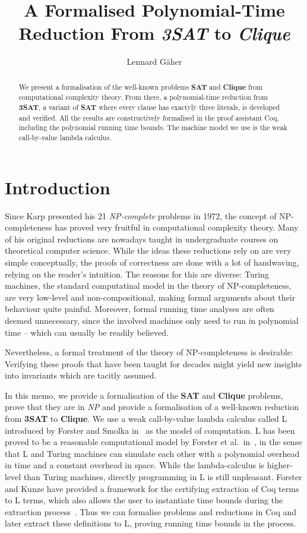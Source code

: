 \documentclass[a4paper,UKenglish,cleveref, autoref]{lipics-v2019}
\title{A Formalised Polynomial-Time Reduction From \emph{3SAT} to \emph{Clique}} %
\author{Lennard Gäher}{Saarland University, Germany}{s8legaeh@stud.uni-saarland.de}{}{}%
\begin{document}
\maketitle

\begin{abstract}
  We present a formalisation of the well-known problems \textbf{SAT} and \textbf{Clique} from computational complexity theory. From there, a polynomial-time reduction from \textbf{3SAT}, a variant of \textbf{SAT} where every clause has exactyly three literals, is developed and verified. 
  All the results are constructively formalised in the proof assistant Coq, including the polynomial running time bounds. The machine model we use is the weak call-by-value lambda calculus. 
\end{abstract}

\section{Introduction}
Since Karp presented his 21 \emph{NP-complete} problems in 1972, the concept of NP-completeness has proved very fruitful in computational complexity theory. Many of his original reductions are nowadays taught in undergraduate courses on theoretical computer science. 
While the ideas these reductions rely on are very simple conceptually, the proofs of correctness are done with a lot of handwaving, relying on the reader's intuition. The reasons for this are diverse: Turing machines, the standard computatinal model in the theory of NP-completeness, are very low-level and non-compositional, making formal arguments about their behaviour quite painful. Moreover, formal running time analyses are often deemed unnecessary, since the involved machines only need to run in polynomial time -- which can usually be readily believed.

Nevertheless, a formal treatment of the theory of NP-completeness is desirable: Verifying these proofs that have been taught for decades might yield new insights into invariants which are tacitly assumed.

In this memo, we provide a formalisation of the \textbf{SAT} and \textbf{Clique} problems, prove that they are in \emph{NP} and provide a formalisation of a well-known reduction from \textbf{3SAT} to \textbf{Clique}. We use a weak call-by-value lambda calculus called L introduced by Forster and Smolka in~\cite{ForsterSmolka:2017:L-Computability} as the model of computation. L has been proved to be a reasonable computational model by Forster et al.\ in~\cite{ForsterKunzeRoth:2019:wcbv-Reasonable}, in the sense that L and Turing machines can simulate each other with a polynomial overhead in time and a constant overhead in space. 
While the lambda-calculus is higher-level than Turing machines, directly programming in L is still unpleasant. Forster and Kunze have provided a framework for the certifying extraction of Coq terms to L terms, which also allows the user to instantiate time bounds during the extraction process~\cite{ForsterKunze:2019:Certifying-extraction}. Thus we can formalise problems and reductions in Coq and later extract these definitions to L, proving running time bounds in the process.
\end{document}
